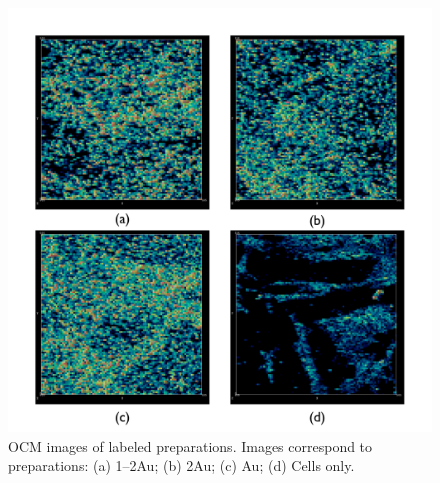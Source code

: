 \begin{figure}[htbp]
\centering
\includegraphics[keepaspectratio,width=\textwidth,height=0.75\textheight]{6marocmreprimages.pdf}
\caption{OCM images of labeled preparations. Images correspond to preparations: (a) 1--2Au; (b) 2Au; (c) Au; (d) Cells only.}
\label{marocmcollage}
\end{figure}

